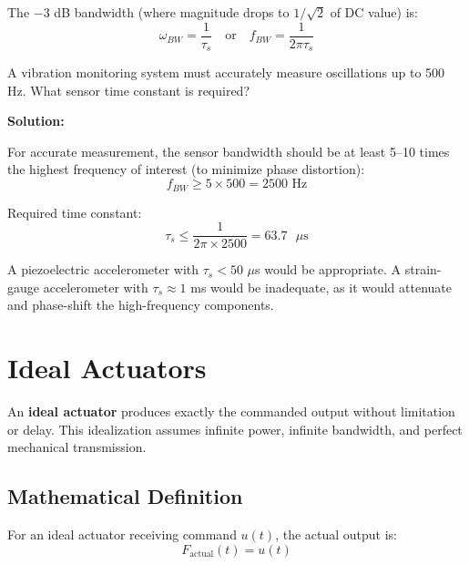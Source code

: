 The $-3$ dB bandwidth (where magnitude drops to $1/\sqrt{2}$ of DC value) is:
\begin{equation}
\omega_{BW} = \frac{1}{\tau_s} \quad \text{or} \quad f_{BW} = \frac{1}{2\pi\tau_s}
\end{equation}

\begin{examplebox}[title=Example 2.2: Accelerometer Bandwidth Requirements]
A vibration monitoring system must accurately measure oscillations up to 500 Hz. What sensor time constant is required?

\textbf{Solution:}

For accurate measurement, the sensor bandwidth should be at least 5--10 times the highest frequency of interest (to minimize phase distortion):
\begin{equation}
f_{BW} \geq 5 \times 500 = 2500 \text{ Hz}
\end{equation}

Required time constant:
\begin{equation}
\tau_s \leq \frac{1}{2\pi \times 2500} = 63.7 \text{ }\mu\text{s}
\end{equation}

A piezoelectric accelerometer with $\tau_s < 50$ $\mu$s would be appropriate. A strain-gauge accelerometer with $\tau_s \approx 1$ ms would be inadequate, as it would attenuate and phase-shift the high-frequency components.
\end{examplebox}

\section{Ideal Actuators}
\label{sec:ideal_actuators}

An \textbf{ideal actuator} produces exactly the commanded output without limitation or delay. This idealization assumes infinite power, infinite bandwidth, and perfect mechanical transmission.

\subsection{Mathematical Definition}

For an ideal actuator receiving command $u(t)$, the actual output is:
\begin{equation}
\boxed{F_{\text{actual}}(t) = u(t)}
\label{eq:ideal_actuator}
\end{equation}

